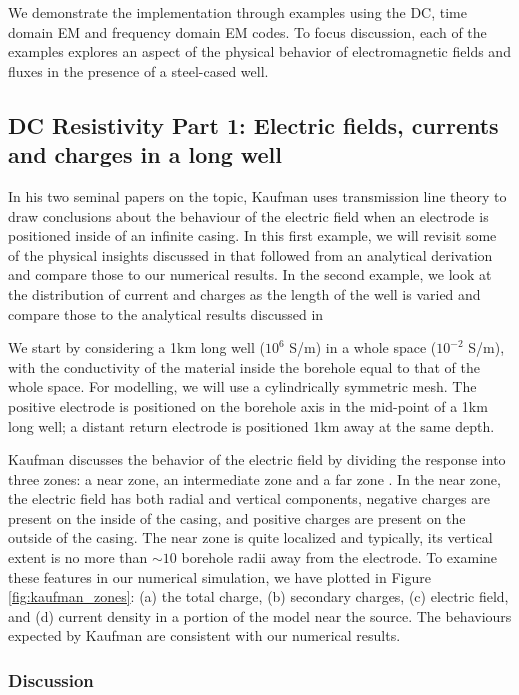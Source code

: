 We demonstrate the implementation through examples using the DC, time domain EM and frequency domain EM codes. To focus discussion, each of the examples explores an aspect of the physical behavior of electromagnetic fields and fluxes in the presence of a steel-cased well.
\subsection{DC Resistivity Part 1: Electric fields, currents and charges in a long well}
\label{sec:dc_resistivity_part1}

In his two seminal papers on the topic, Kaufman uses transmission line theory to draw conclusions about the behaviour of the electric field when an electrode is positioned inside of an infinite casing. In this first example, we will revisit some of the physical insights discussed in \citep{Kaufman1990, Kaufman1993} that followed from an analytical derivation and compare those to our numerical results. In the second example, we look at the distribution of current and charges as the length of the well is varied and compare those to the analytical results discussed in \citep{Kaufman1993}

We start by considering a 1km long well ($10^6$ S/m) in a whole space ($10^{-2}$ S/m), with the conductivity of the material inside the borehole equal to that of the whole space.  For modelling, we will use a cylindrically symmetric mesh. The positive electrode is positioned on the borehole axis in the mid-point of a 1km long well;  a distant return electrode is positioned 1km away at the same depth.

Kaufman discusses the behavior of the electric field by dividing the response into three zones: a near zone, an intermediate zone and a far zone \citep{Kaufman1990, Kaufman1993}. In the near zone, the electric field has both radial and vertical components, negative charges are present on the inside of the casing, and positive charges are present on the outside of the casing. The near zone is quite localized and typically, its vertical extent is no more than $\sim 10$ borehole radii away from the electrode. To examine these features in our numerical simulation, we have plotted in Figure \ref{fig:kaufman_zones}: (a)  the total charge, (b) secondary charges, (c) electric field, and (d) current density in a portion of the model near the source. The behaviours expected by Kaufman are consistent with our numerical results.

\subsubsection{Discussion}

